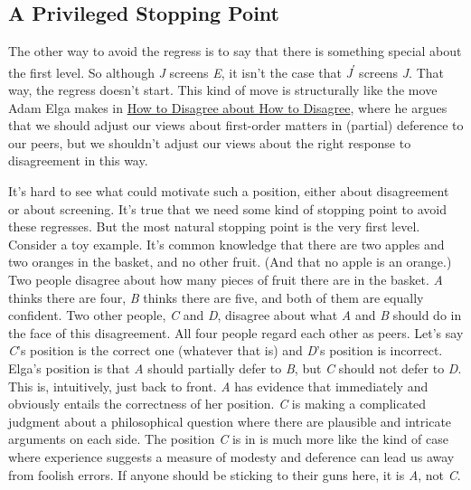 \documentclass[
  11pt,
  letterpaper,
  DIV=11,
  numbers=noendperiod,
  twoside]{scrartcl}
\begin{document}
\subsection{A Privileged Stopping
Point}\label{a-privileged-stopping-point}

The other way to avoid the regress is to say that there is something
special about the first level. So although \emph{J} screens \emph{E}, it
isn't the case that \emph{J}\textsuperscript{ʹ} screens \emph{J}. That
way, the regress doesn't start. This kind of move is structurally like
the move Adam Elga makes in
\href{http://philsci-archive.pitt.edu/archive/00003702/}{How to Disagree
about How to Disagree}, where he argues that we should adjust our views
about first-order matters in (partial) deference to our peers, but we
shouldn't adjust our views about the right response to disagreement in
this way.

It's hard to see what could motivate such a position, either about
disagreement or about screening. It's true that we need some kind of
stopping point to avoid these regresses. But the most natural stopping
point is the very first level. Consider a toy example. It's common
knowledge that there are two apples and two oranges in the basket, and
no other fruit. (And that no apple is an orange.) Two people disagree
about how many pieces of fruit there are in the basket. \emph{A} thinks
there are four, \emph{B} thinks there are five, and both of them are
equally confident. Two other people, \emph{C} and \emph{D}, disagree
about what \emph{A} and \emph{B} should do in the face of this
disagreement. All four people regard each other as peers. Let's say
\emph{C}'s position is the correct one (whatever that is) and \emph{D}'s
position is incorrect. Elga's position is that \emph{A} should partially
defer to \emph{B}, but \emph{C} should not defer to \emph{D}. This is,
intuitively, just back to front. \emph{A} has evidence that immediately
and obviously entails the correctness of her position. \emph{C} is
making a complicated judgment about a philosophical question where there
are plausible and intricate arguments on each side. The position
\emph{C} is in is much more like the kind of case where experience
suggests a measure of modesty and deference can lead us away from
foolish errors. If anyone should be sticking to their guns here, it is
\emph{A}, not \emph{C}.
\end{document}
